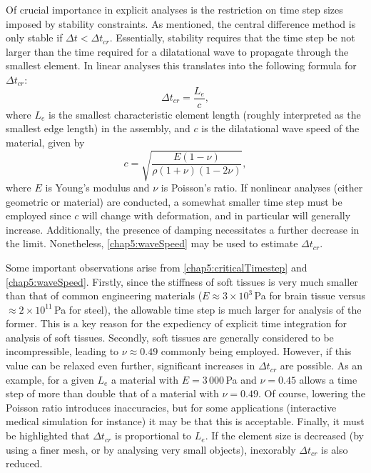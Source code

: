 \bigskip

Of crucial importance in explicit analyses is the restriction on time step sizes imposed by stability constraints\label{chap5:discussionTimestep}. As mentioned, the central difference method is only stable if $ \Delta t <  \Delta t_{cr} $. Essentially, stability requires that the time step be not larger than the time required for a dilatational wave to propagate through the smallest element. In linear analyses this translates into the following formula for $ \Delta t_{cr}$:
\begin{equation}
\label{chap5:criticalTimestep}
\Delta t_{cr} = \dfrac{L_e}{c},
\end{equation}
where $ L_e $ is the smallest characteristic element length (roughly interpreted as the smallest edge length) in the assembly, and $c$ is the dilatational wave speed of the material, given by
\begin{equation}
\label{chap5:waveSpeed}
c = \sqrt{\dfrac{E (1 - \nu)}{\rho (1+\nu)(1-2\nu)}},
\end{equation}
where $E$ is Young's modulus and $\nu$ is Poisson's ratio. If nonlinear analyses (either geometric or material) are conducted, a somewhat smaller time step must be employed since $c$ will change with deformation, and in particular will generally increase. Additionally, the presence of damping necessitates a further decrease in the limit. Nonetheless, \eqref{chap5:waveSpeed} may be used to estimate $ \Delta t_{cr}$. 

Some important observations arise from \eqref{chap5:criticalTimestep} and \eqref{chap5:waveSpeed}. Firstly, since the stiffness of soft tissues is very much smaller than that of common engineering materials ($E \approx 3 \times 10^3\, $Pa for brain tissue versus $\approx 2 \times 10^{11}\, $Pa for steel), the allowable time step is much larger for analysis of the former. This is a key reason for the expediency of explicit time integration for analysis of soft tissues. Secondly, soft tissues are generally considered to be incompressible, leading to $\nu \approx 0.49$ commonly being employed. However, if this value can be relaxed even further, significant increases in $ \Delta t_{cr}$ are possible. As an example, for a given $ L_e $ a material with $E = 3\,000\, $Pa and $\nu = 0.45$ allows a time step of more than double that of a material with $\nu = 0.49$. Of course, lowering the Poisson ratio introduces inaccuracies, but for some applications (interactive medical simulation for instance) it may be that this is acceptable. Finally, it must be highlighted that $ \Delta t_{cr}$ is proportional to $ L_e $. If the element size is decreased (by using a finer mesh, or by analysing very small objects), inexorably $ \Delta t_{cr}$ is also reduced. 



